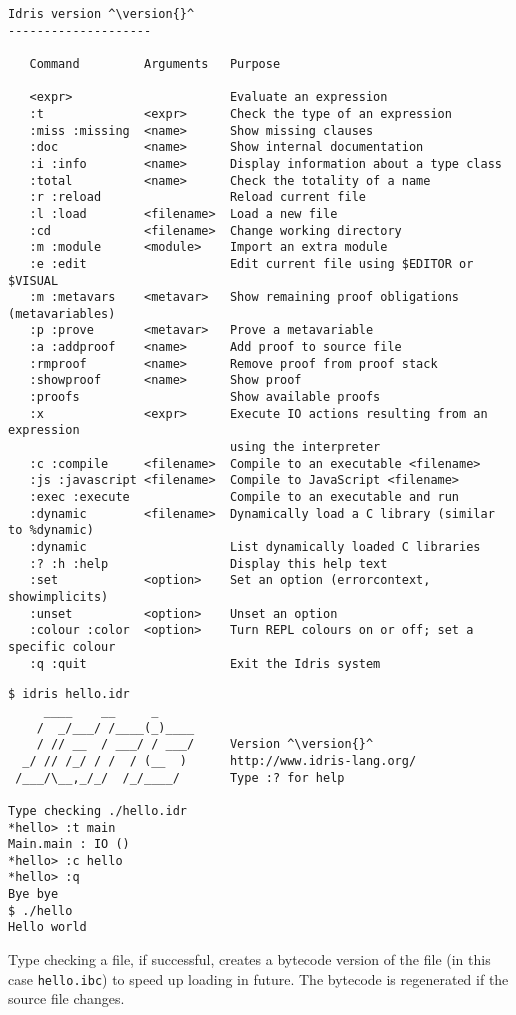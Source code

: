 \begin{lstlisting}[caption={Interactive environment commands}, label=cmds, escapechar=^]
Idris version ^\version{}^
--------------------

   Command         Arguments   Purpose
                               
   <expr>                      Evaluate an expression
   :t              <expr>      Check the type of an expression
   :miss :missing  <name>      Show missing clauses
   :doc            <name>      Show internal documentation
   :i :info        <name>      Display information about a type class
   :total          <name>      Check the totality of a name
   :r :reload                  Reload current file
   :l :load        <filename>  Load a new file
   :cd             <filename>  Change working directory
   :m :module      <module>    Import an extra module
   :e :edit                    Edit current file using $EDITOR or $VISUAL
   :m :metavars    <metavar>   Show remaining proof obligations (metavariables)
   :p :prove       <metavar>   Prove a metavariable
   :a :addproof    <name>      Add proof to source file
   :rmproof        <name>      Remove proof from proof stack
   :showproof      <name>      Show proof
   :proofs                     Show available proofs
   :x              <expr>      Execute IO actions resulting from an expression 
                               using the interpreter
   :c :compile     <filename>  Compile to an executable <filename>
   :js :javascript <filename>  Compile to JavaScript <filename>
   :exec :execute              Compile to an executable and run
   :dynamic        <filename>  Dynamically load a C library (similar to %dynamic)
   :dynamic                    List dynamically loaded C libraries
   :? :h :help                 Display this help text
   :set            <option>    Set an option (errorcontext, showimplicits)
   :unset          <option>    Unset an option
   :colour :color  <option>    Turn REPL colours on or off; set a specific colour
   :q :quit                    Exit the Idris system
\end{lstlisting}

\begin{lstlisting}[caption={Sample Interactive Run}, label=run1, escapechar=^]
$ idris hello.idr
     ____    __     _                                          
    /  _/___/ /____(_)____                                     
    / // __  / ___/ / ___/     Version ^\version{}^
  _/ // /_/ / /  / (__  )      http://www.idris-lang.org/      
 /___/\__,_/_/  /_/____/       Type :? for help        

Type checking ./hello.idr
*hello> :t main 
Main.main : IO ()
*hello> :c hello 
*hello> :q 
Bye bye
$ ./hello 
Hello world
\end{lstlisting}

\noindent
Type checking a file, if successful, creates a bytecode version of the file (in this case \texttt{hello.ibc}) to speed up loading in future.
The bytecode is regenerated if the source file changes.

